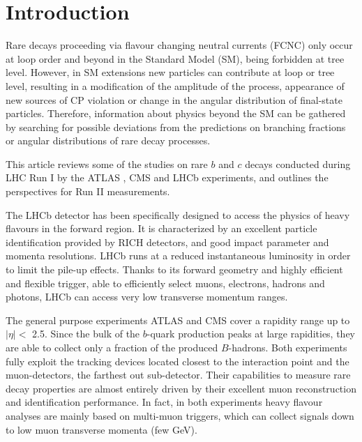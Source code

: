 %
%
%
\section{Introduction}
\label{intro}
Rare decays proceeding via flavour changing neutral currents (FCNC) only occur at loop order and beyond in the Standard Model (SM), being forbidden at tree level.
However, in SM extensions new particles can contribute at loop or tree level, resulting in a modification of the amplitude of the process, appearance of new sources of CP violation or change in the angular distribution of final-state particles.
Therefore, information about physics beyond the SM can be gathered by searching for possible deviations from the predictions on branching fractions or angular distributions of rare decay processes.

This article reviews some of the studies on rare $b$ and $c$ decays conducted during LHC Run I by the ATLAS \cite{ATLAS}, CMS \cite{CMS} and LHCb \cite{LHCb} 
experiments, and outlines the perspectives for Run II measurements.

The LHCb detector has been specifically designed to access the physics of heavy flavours in the forward region.
It is characterized by an excellent particle identification provided by RICH detectors, and good impact parameter and momenta resolutions.
LHCb runs at a reduced instantaneous luminosity in order to limit the pile-up effects.
Thanks to its forward geometry and highly efficient and flexible trigger, able to efficiently select muons, electrons, hadrons and photons, LHCb can access very low transverse momentum ranges.

The general purpose experiments ATLAS and CMS cover a rapidity range up to $|\eta | <$ 2.5.
Since the bulk of the $b$-quark production peaks at large rapidities, they are able to collect only a fraction of the produced $B$-hadrons.
Both experiments fully exploit the tracking devices located closest to the interaction point and the muon-detectors, the farthest out sub-detector. 
Their capabilities to measure rare decay properties are almost entirely driven by their excellent muon reconstruction and identification performance. In fact, in both experiments heavy flavour analyses are mainly based on multi-muon triggers, which can collect signals down to low muon transverse momenta (few GeV).


